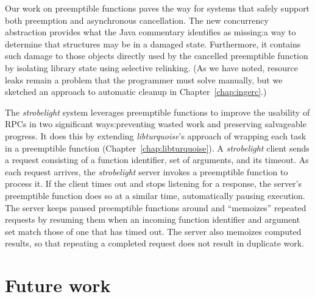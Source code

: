 Our work on preemptible functions paves the way for systems that safely support both
preemption and asynchronous cancellation.  The new concurrency abstraction provides
what the Java commentary identifies as missing:\@ a way to determine that structures
may be in a damaged state.  Furthermore, it contains such damage to those objects
directly used by the cancelled preemptible function by isolating library
state using selective relinking.  (As we have noted, resource leaks remain a problem
that the programmer must solve manually, but we sketched an approach to automatic
cleanup in Chapter~\ref{chap:ingerc}.)

The \textit{strobelight} system leverages preemptible functions to improve the
usability of RPCs in two significant ways:\@ preventing wasted work and preserving
salvageable progress.  It does this by extending \textit{libturquoise}'s approach of
wrapping each task in a preemptible function (Chapter~\ref{chap:libturquoise}).  A
\textit{strobelight} client sends a request consisting of a function identifier, set
of arguments, and its timeout.  As each request arrives, the \textit{strobelight}
server invokes a preemptible function to process it.  If the client times out and
stops listening for a response, the server's preemptible function does so at a
similar time, automatically pausing execution.  The server keeps paused preemptible
functions around and ``memoizes'' repeated requests by resuming them when an incoming
function identifier and argument set match those of one that has timed out.  The
server also memoizes computed results, so that repeating a completed request does not
result in duplicate work.


\section{Future work}


